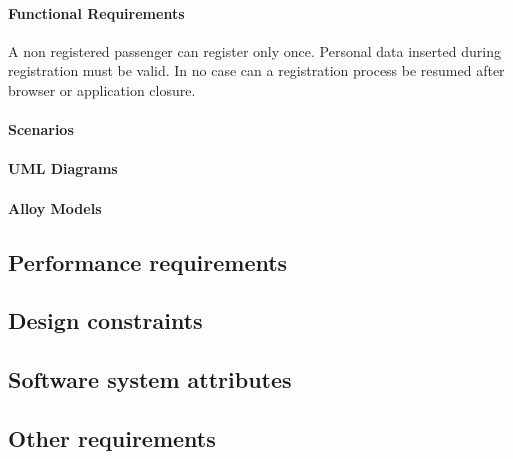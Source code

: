 \paragraph{Functional Requirements}
\begin{itemize}
	 A non registered passenger can register only once.
	 Personal data inserted during registration must be valid.
	 In no case can a registration process be resumed after browser or application closure.
\end{itemize}
\paragraph{Scenarios}
\paragraph{UML Diagrams}
\paragraph{Alloy Models}
\subsection{Performance requirements}
\subsection{Design constraints}
\subsection{Software system attributes}
\subsection{Other requirements}
